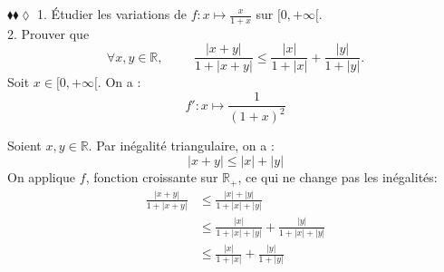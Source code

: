 \documentclass[11pt]{article}
\begin{document}
\begin{exercice}{$\blacklozenge\blacklozenge\lozenge$}
    1. Étudier les variations de $f:x\mapsto\frac{x}{1+x}$ sur $[0,+\infty[$.\\
    2. Prouver que
    \begin{equation*}
        \forall{x,y\in\mathbb{R}}, \hspace{1cm} \frac{|x+y|}{1+|x+y|}\leq\frac{|x|}{1+|x|}+\frac{|y|}{1+|y|}.
    \end{equation*}
    \tcblower
     Soit $x\in\lbrack0,+\infty\lbrack$. On a :
    \begin{equation*}
        f':x\mapsto\frac{1}{(1+x)^2}
    \end{equation*}
    \begin{center}
    \end{center}
     Soient $x,y\in\mathbb{R}$. Par inégalité triangulaire, on a :
    \begin{equation*}
        |x+y|\leq|x|+|y|
    \end{equation*}
    On applique $f$, fonction croissante sur $\mathbb{R}_+$, ce qui ne change pas les inégalités:
    \begin{align*}
        \frac{|x+y|}{1+|x+y|}&\leq\frac{|x|+|y|}{1+|x|+|y|}\\
        &\leq\frac{|x|}{1+|x|+|y|}+\frac{|y|}{1+|x|+|y|}\\
        &\leq\frac{|x|}{1+|x|}+\frac{|y|}{1+|y|}
    \end{align*}
\end{exercice}
\end{document}
